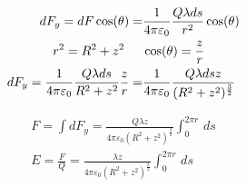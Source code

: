 \documentclass[a4paper,11pt]{article}
\begin{document}
\begin{align*}
     dF_y = dF \cos(\theta) =& \frac{1}{4 \pi \varepsilon_0} \frac{Q \lambda ds}{r^2} \cos(\theta)
     \\
     r^2 = R^2 + z^2 \hspace{5mm} &\cos(\theta) = \frac{z}{r} 
     \\
     dF_y = \frac{1}{4 \pi \varepsilon_0} \frac{Q \lambda ds}{R^2 + z^2} \frac{z}{r}  =& \frac{1}{4 \pi \varepsilon_0} \frac{Q \lambda ds z}{(R^2 + z^2)^\frac{3}{2}}
\end{align*}

    \begin{align*}
        F = \int dF_y = \frac{Q \lambda z}{4 \pi \varepsilon_0 (R^2 + z^2)^\frac{3}{2}} \int_{0}^{2\pi r}  \,ds 
        \\
        E = \frac{F}{Q} = \frac{ \lambda z}{4 \pi \varepsilon_0 (R^2 + z^2)^\frac{3}{2}} \int_{0}^{2\pi r}  \,ds
    \end{align*}
\end{document}
